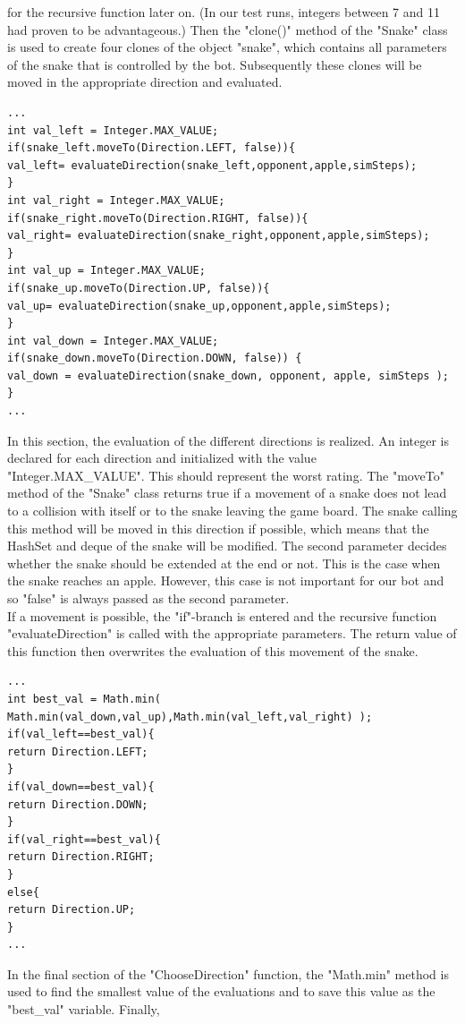 \documentclass[a4paper,12pt]{article}
\begin{document}
for the recursive function later on. (In our test runs, integers between 7 and 11 had proven to be
advantageous.) Then the "clone()" method of the "Snake" class is used to create four clones of the
object "snake", which contains all parameters of the snake that is controlled by the bot.
Subsequently these clones will be moved in the appropriate direction and evaluated.
\begin{verbatim}
...
int val_left = Integer.MAX_VALUE;
if(snake_left.moveTo(Direction.LEFT, false)){
val_left= evaluateDirection(snake_left,opponent,apple,simSteps);
}
int val_right = Integer.MAX_VALUE;
if(snake_right.moveTo(Direction.RIGHT, false)){
val_right= evaluateDirection(snake_right,opponent,apple,simSteps);
}
int val_up = Integer.MAX_VALUE;
if(snake_up.moveTo(Direction.UP, false)){
val_up= evaluateDirection(snake_up,opponent,apple,simSteps);
}
int val_down = Integer.MAX_VALUE;
if(snake_down.moveTo(Direction.DOWN, false)) {
val_down = evaluateDirection(snake_down, opponent, apple, simSteps );
}
...
\end{verbatim}
In this section, the evaluation of the different directions is realized. An integer is declared for each direction and initialized with the value "Integer.MAX\_VALUE". This should represent the worst
rating. The "moveTo" method of the "Snake" class returns true if a movement of a snake does not
lead to a collision with itself or to the snake leaving the game board. The snake calling this method
will be moved in this direction if possible, which means that the HashSet and deque of the snake
will be modified. The second parameter decides whether the snake should be extended at the end or
not. This is the case when the snake reaches an apple. However, this case is not important for our
bot and so "false" is always passed as the second parameter.\\
If a movement is possible, the "if"-branch is entered and the recursive function "evaluateDirection"
is called with the appropriate parameters. The return value of this function then overwrites the
evaluation of this movement of the snake.
\begin{verbatim}
...
int best_val = Math.min( Math.min(val_down,val_up),Math.min(val_left,val_right) );
if(val_left==best_val){
return Direction.LEFT;
}
if(val_down==best_val){
return Direction.DOWN;
}
if(val_right==best_val){
return Direction.RIGHT;
}
else{
return Direction.UP;
}
...
\end{verbatim}
In the final section of the "ChooseDirection" function, the "Math.min" method is used to find the
smallest value of the evaluations and to save this value as the "best\_val" variable. Finally,
\end{document}
